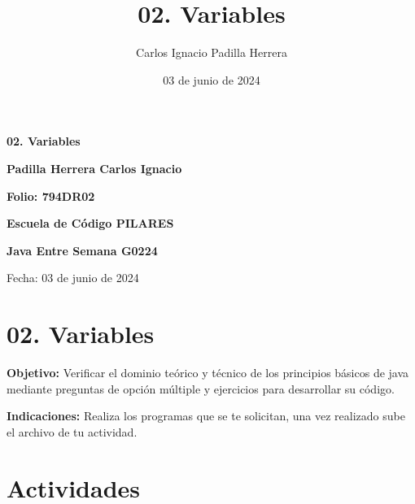 \documentclass{article}
\title{02. Variables}
\author{Carlos Ignacio Padilla Herrera}
\date{03 de junio de 2024}
\begin{document}

\tcbstartrecording

\begin{titlepage}
    \centering
    \vspace*{2cm}

    \Huge
    \textbf{02. Variables}

    \vspace{1.5cm}

    \LARGE
    \textbf{Padilla Herrera Carlos Ignacio}

    \vspace{0.5cm}

    \Large
    \textbf{Folio: 794DR02}

    \vspace{1.5cm}

    \LARGE
    \textbf{Escuela de Código PILARES}


    \LARGE
    \textbf{Java Entre Semana G0224}

    \vspace{0.5cm}

    \Large
    Fecha: 03 de junio de 2024

    \vfill
\end{titlepage}

\maketitle

\section*{02. Variables}
\textbf{Objetivo:} Verificar el dominio teórico y técnico de los principios básicos de java mediante preguntas de opción múltiple y ejercicios para desarrollar su código.

\textbf{Indicaciones:} Realiza los programas que se te solicitan, una vez realizado sube el archivo de tu actividad.

\section*{Actividades}
\end{document}
